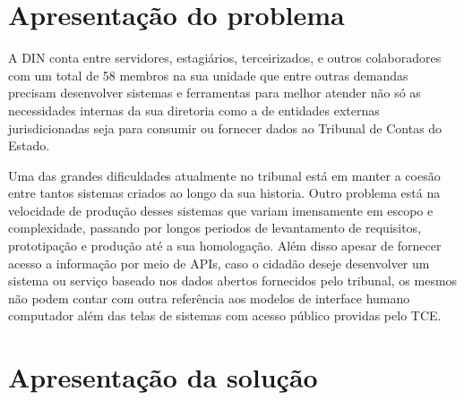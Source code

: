 \section{Apresentação do problema }

  A DIN conta entre servidores, estagiários, terceirizados, e outros colaboradores com um total de 58 membros na sua unidade \cite{relatorio_trimestral} que entre outras demandas precisam desenvolver sistemas e ferramentas para melhor atender não só as necessidades internas da sua diretoria como a de entidades externas jurisdicionadas seja para consumir ou fornecer dados ao Tribunal de Contas do Estado.

  Uma das grandes dificuldades atualmente no tribunal está em manter a coesão entre tantos sistemas criados ao longo da sua historia. Outro problema está na velocidade de produção desses sistemas que variam imensamente em escopo e complexidade, passando por longos periodos de levantamento de requisitos, prototipação e produção até a sua homologação. Além disso apesar de fornecer acesso a informação por meio de APIs, caso o cidadão deseje desenvolver um sistema ou serviço baseado nos dados abertos fornecidos pelo tribunal, os mesmos não podem contar com outra referência aos modelos de interface humano computador além das telas de sistemas com acesso público providas pelo TCE.



\section{Apresentação da solução }

